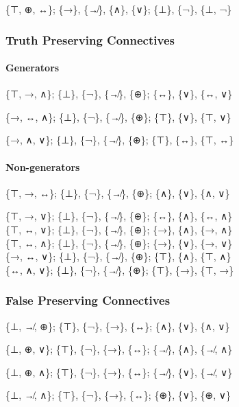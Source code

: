 \{⊤, ⊕, ↔\}; \{→\}, \{↛\}, \{∧\}, \{∨\}; \{⊥\}, \{¬\}, \{⊥, ¬\}

\hypertarget{truth-preserving-connectives}{%
\subsubsection{Truth Preserving
Connectives}\label{truth-preserving-connectives}}

\hypertarget{generators-2}{%
\paragraph{Generators}\label{generators-2}}

\{⊤, →, ∧\}; \{⊥\}, \{¬\}, \{↛\}, \{⊕\}; \{↔\}, \{∨\}, \{↔, ∨\}

\{→, ↔, ∧\}; \{⊥\}, \{¬\}, \{↛\}, \{⊕\}; \{⊤\}, \{∨\}, \{⊤, ∨\}

\{→, ∧, ∨\}; \{⊥\}, \{¬\}, \{↛\}, \{⊕\}; \{⊤\}, \{↔\}, \{⊤, ↔\}

\hypertarget{non-generators-2}{%
\paragraph{Non-generators}\label{non-generators-2}}

\{⊤, →, ↔\}; \{⊥\}, \{¬\}, \{↛\}, \{⊕\}; \{∧\}, \{∨\}, \{∧, ∨\}

\{⊤, →, ∨\}; \{⊥\}, \{¬\}, \{↛\}, \{⊕\}; \{↔\}, \{∧\}, \{↔, ∧\}\\
\{⊤, ↔, ∨\}; \{⊥\}, \{¬\}, \{↛\}, \{⊕\}; \{→\}, \{∧\}, \{→, ∧\}\\
\{⊤, ↔, ∧\}; \{⊥\}, \{¬\}, \{↛\}, \{⊕\}; \{→\}, \{∨\}, \{→, ∨\}\\
\{→, ↔, ∨\}; \{⊥\}, \{¬\}, \{↛\}, \{⊕\}; \{⊤\}, \{∧\}, \{⊤, ∧\}\\
\{↔, ∧, ∨\}; \{⊥\}, \{¬\}, \{↛\}, \{⊕\}; \{⊤\}, \{→\}, \{⊤, →\}

\hypertarget{false-preserving-connectives}{%
\subsubsection{False Preserving
Connectives}\label{false-preserving-connectives}}

\{⊥, ↛, ⊕\}; \{⊤\}, \{¬\}, \{→\}, \{↔\}; \{∧\}, \{∨\}, \{∧, ∨\}

\{⊥, ⊕, ∨\}; \{⊤\}, \{¬\}, \{→\}, \{↔\}; \{↛\}, \{∧\}, \{↛, ∧\}

\{⊥, ⊕, ∧\}; \{⊤\}, \{¬\}, \{→\}, \{↔\}; \{↛\}, \{∨\}, \{↛, ∨\}

\{⊥, ↛, ∧\}; \{⊤\}, \{¬\}, \{→\}, \{↔\}; \{⊕\}, \{∨\}, \{⊕, ∨\}

